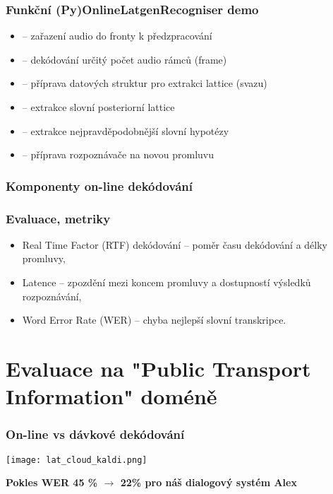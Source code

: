 \begin{frame}\frametitle{Funkční (Py)OnlineLatgenRecogniser demo} 
    \begin{itemize}
        \item {} -- zařazení audio do fronty k předzpracování
        \item {} -- dekódování určitý počet audio rámců (frame)
        \item {} -- příprava datových struktur pro extrakci lattice (svazu)
        \item {} -- extrakce slovní posteriorní lattice
        \item {} -- extrakce nejpravděpodobnější slovní hypotézy
        \item {} -- příprava rozpoznávače na novou promluvu
    \end{itemize}
    \begin{center}
        
    \end{center}
\end{frame}

\begin{frame}\frametitle{Komponenty on-line dekódování} 
    \begin{center}
        
    \end{center}
\end{frame}


\begin{frame}\frametitle{Evaluace, metriky} 
    \begin{itemize}
        \item Real Time Factor (RTF) dekódování -- poměr času dekódování a délky promluvy,
        \item Latence -- zpozdění mezi koncem promluvy a dostupností výsledků rozpoznávání,
        \item Word Error Rate (WER) -- chyba nejlepší slovní transkripce.
    \end{itemize}
\end{frame}

\section[Evaluace na "PTI"]{Evaluace na "Public Transport Information" doméně}%

\begin{frame}\frametitle{On-line vs dávkové dekódování} 
    \begin{center}
        \texttt{[image: lat\_cloud\_kaldi.png]}
    \end{center}
    \bf {Pokles WER 45 \% $\longrightarrow$ 22\%} pro náš dialogový systém Alex
\end{frame}

